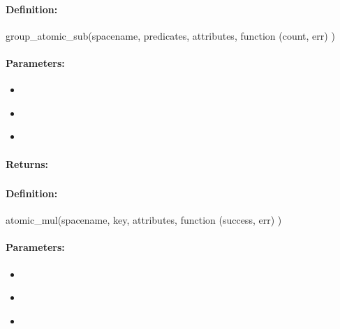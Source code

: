\paragraph{Definition:}
\begin{javascriptcode}
group_atomic_sub(spacename, predicates, attributes, function (count, err) {})
\end{javascriptcode}
\paragraph{Parameters:}
\begin{itemize}[noitemsep]
\item {}\\

\item {}\\

\item {}\\

\end{itemize}

\paragraph{Returns:}


\pagebreak
\subsubsection{}
\label{api:nodejs:atomic_mul}


\paragraph{Definition:}
\begin{javascriptcode}
atomic_mul(spacename, key, attributes, function (success, err) {})
\end{javascriptcode}
\paragraph{Parameters:}
\begin{itemize}[noitemsep]
\item {}\\

\item {}\\

\item {}\\

\end{itemize}

